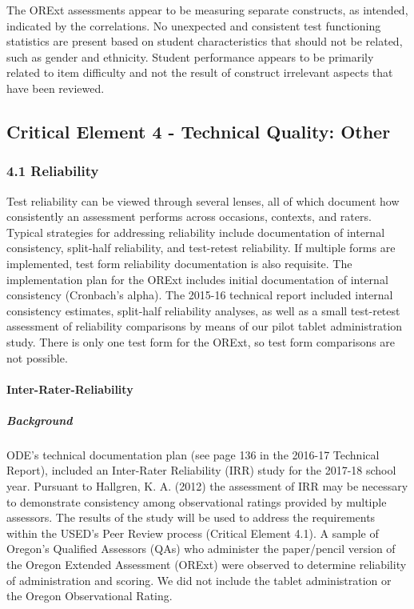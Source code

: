 \documentclass[]{article}
\let\oldparagraph\paragraph
\renewcommand{\paragraph}[1]{\oldparagraph{#1}\mbox{}}
\let\oldsubparagraph\subparagraph
\renewcommand{\subparagraph}[1]{\oldsubparagraph{#1}\mbox{}}
\begin{document}
The ORExt assessments appear to be measuring separate constructs, as
intended, indicated by the correlations. No unexpected and consistent
test functioning statistics are present based on student characteristics
that should not be related, such as gender and ethnicity. Student
performance appears to be primarily related to item difficulty and not
the result of construct irrelevant aspects that have been reviewed.

\subsection{Critical Element 4 - Technical Quality:
Other}\label{critical-element-4---technical-quality-other}

\subsubsection{4.1 Reliability}\label{reliability}

Test reliability can be viewed through several lenses, all of which
document how consistently an assessment performs across occasions,
contexts, and raters. Typical strategies for addressing reliability
include documentation of internal consistency, split-half reliability,
and test-retest reliability. If multiple forms are implemented, test
form reliability documentation is also requisite. The implementation
plan for the ORExt includes initial documentation of internal
consistency (Cronbach's alpha). The 2015-16 technical report included
internal consistency estimates, split-half reliability analyses, as well
as a small test-retest assessment of reliability comparisons by means of
our pilot tablet administration study. There is only one test form for
the ORExt, so test form comparisons are not possible.

\paragraph{Inter-Rater-Reliability}\label{inter-rater-reliability}

\subparagraph{Background}\label{background}

ODE's technical documentation plan (see page 136 in the 2016-17
Technical Report), included an Inter-Rater Reliability (IRR) study for
the 2017-18 school year. Pursuant to Hallgren, K. A. (2012) the
assessment of IRR may be necessary to demonstrate consistency among
observational ratings provided by multiple assessors. The results of the
study will be used to address the requirements within the USED's Peer
Review process (Critical Element 4.1). A sample of Oregon's Qualified
Assessors (QAs) who administer the paper/pencil version of the Oregon
Extended Assessment (ORExt) were observed to determine reliability of
administration and scoring. We did not include the tablet administration
or the Oregon Observational Rating.
\end{document}
